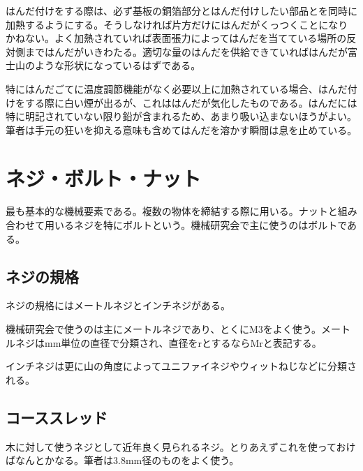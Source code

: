 \documentclass[a4paper,titlepage,here]{ujarticle}
\begin{document}
はんだ付けをする際は、必ず基板の銅箔部分とはんだ付けしたい部品とを同時に加熱するようにする。そうしなければ片方だけにはんだがくっつくことになりかねない。よく加熱されていれば表面張力によってはんだを当てている場所の反対側まではんだがいきわたる。適切な量のはんだを供給できていればはんだが富士山のような形状になっているはずである。

特にはんだごてに温度調節機能がなく必要以上に加熱されている場合、はんだ付けをする際に白い煙が出るが、これははんだが気化したものである。はんだには特に明記されていない限り鉛が含まれるため、あまり吸い込まないほうがよい。筆者は手元の狂いを抑える意味も含めてはんだを溶かす瞬間は息を止めている。
\section{ネジ・ボルト・ナット}
最も基本的な機械要素である。複数の物体を締結する際に用いる。ナットと組み合わせて用いるネジを特にボルトという。機械研究会で主に使うのはボルトである。
\subsection{ネジの規格}
ネジの規格にはメートルネジとインチネジがある。

機械研究会で使うのは主にメートルネジであり、とくにM3をよく使う。メートルネジはmm単位の直径で分類され、直径をrとするならMrと表記する。

インチネジは更に山の角度によってユニファイネジやウィットねじなどに分類される。
\subsection{コーススレッド}
木に対して使うネジとして近年良く見られるネジ。とりあえずこれを使っておけばなんとかなる。筆者は3.8mm径のものをよく使う。
\end{document}
